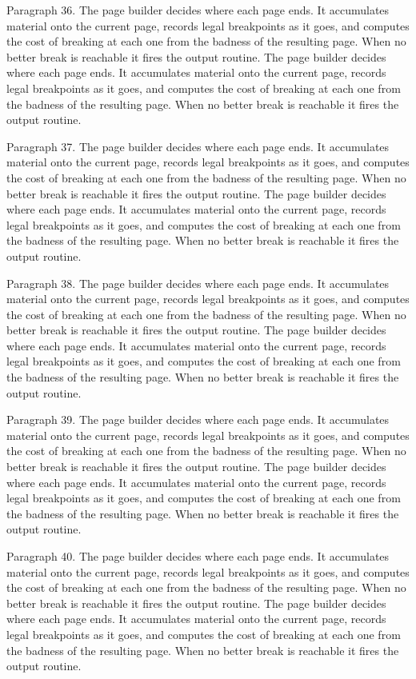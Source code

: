 Paragraph 36. The page builder decides where each page ends. It accumulates material onto the current page, records legal breakpoints as it goes, and computes the cost of breaking at each one from the badness of the resulting page. When no better break is reachable it fires the output routine. The page builder decides where each page ends. It accumulates material onto the current page, records legal breakpoints as it goes, and computes the cost of breaking at each one from the badness of the resulting page. When no better break is reachable it fires the output routine. 

Paragraph 37. The page builder decides where each page ends. It accumulates material onto the current page, records legal breakpoints as it goes, and computes the cost of breaking at each one from the badness of the resulting page. When no better break is reachable it fires the output routine. The page builder decides where each page ends. It accumulates material onto the current page, records legal breakpoints as it goes, and computes the cost of breaking at each one from the badness of the resulting page. When no better break is reachable it fires the output routine. 

Paragraph 38. The page builder decides where each page ends. It accumulates material onto the current page, records legal breakpoints as it goes, and computes the cost of breaking at each one from the badness of the resulting page. When no better break is reachable it fires the output routine. The page builder decides where each page ends. It accumulates material onto the current page, records legal breakpoints as it goes, and computes the cost of breaking at each one from the badness of the resulting page. When no better break is reachable it fires the output routine. 

Paragraph 39. The page builder decides where each page ends. It accumulates material onto the current page, records legal breakpoints as it goes, and computes the cost of breaking at each one from the badness of the resulting page. When no better break is reachable it fires the output routine. The page builder decides where each page ends. It accumulates material onto the current page, records legal breakpoints as it goes, and computes the cost of breaking at each one from the badness of the resulting page. When no better break is reachable it fires the output routine. 

Paragraph 40. The page builder decides where each page ends. It accumulates material onto the current page, records legal breakpoints as it goes, and computes the cost of breaking at each one from the badness of the resulting page. When no better break is reachable it fires the output routine. The page builder decides where each page ends. It accumulates material onto the current page, records legal breakpoints as it goes, and computes the cost of breaking at each one from the badness of the resulting page. When no better break is reachable it fires the output routine. 

